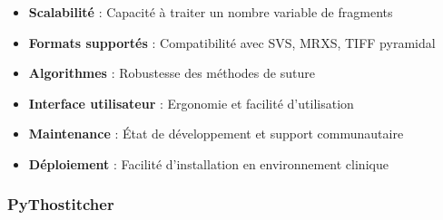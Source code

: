 \documentclass[12pt,a4paper]{report}
\begin{document}
\begin{tcolorbox}[colback=TechBlue!10, colframe=TechBlue, title=Critères d'Évaluation]
\begin{itemize}[leftmargin=*]
    \item \textbf{Scalabilité} : Capacité à traiter un nombre variable de fragments
    \item \textbf{Formats supportés} : Compatibilité avec SVS, MRXS, TIFF pyramidal
    \item \textbf{Algorithmes} : Robustesse des méthodes de suture
    \item \textbf{Interface utilisateur} : Ergonomie et facilité d'utilisation
    \item \textbf{Maintenance} : État de développement et support communautaire
    \item \textbf{Déploiement} : Facilité d'installation en environnement clinique
\end{itemize}
\end{tcolorbox}

\subsubsection{PyThostitcher}
\end{document}
